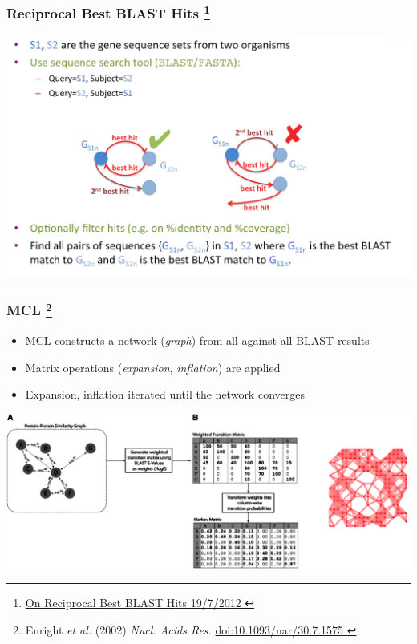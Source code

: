 \begin{frame}
  \frametitle{Reciprocal Best BLAST Hits
    \footnote{\tiny\href{http://armchairbiology.blogspot.co.uk/2012/07/on-reciprocal-best-blast-hits.html}{On Reciprocal Best BLAST Hits 19/7/2012
    }}
  }
  \begin{center}
      \includegraphics[width=1\textwidth]{images/rbbh}      
  \end{center}
\end{frame}

% 
\begin{frame}
  \frametitle{MCL
    \footnote{\tiny{Enright \textit{et al.} (2002) \textit{Nucl. Acids Res.} \href{http://dx.doi.org/10.1093/nar/30.7.1575}{doi:10.1093/nar/30.7.1575
    }}}
  }
  \begin{itemize}
    \item MCL constructs a network (\textit{graph}) from all-against-all BLAST results
    \item \textcolor{hutton_green}{Matrix operations (\textit{expansion}, \textit{inflation}) are applied}
    \item \textcolor{hutton_blue}{Expansion, inflation iterated until the network converges}
  \end{itemize}
  \begin{center}
      \includegraphics[width=1\textwidth]{images/mcl_intro}
  \end{center}
\end{frame}

